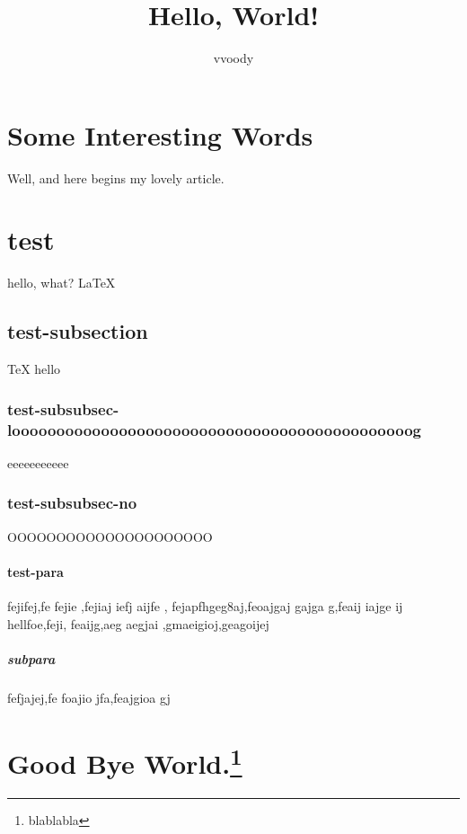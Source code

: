 \documentclass[a4paper,11pt, twoside]{article}
\author{vvoody}
\title{Hello, World!}
\begin{document}

\maketitle


\tableofcontents

\newpage
\section{Some Interesting Words}

Well, and here begins my lovely article.

\section{test}

hello, what? \LaTeX
\label{sec:sec1}

\subsection{test-subsection}

\TeX{} hello

\subsubsection[not-too-long]{test-subsubsec-looooooooooooooooooooooooooooooooooooooooooooog}

eeeeeeeeeee

\subsubsection*{test-subsubsec-no}

OOOOOOOOOOOOOOOOOOOOO

\paragraph{test-para}

fejifej,fe fejie ,fejiaj iefj aijfe ,
fejapfhgeg8aj,feoajgaj gajga g,feaij iajge ij hellfoe,feji,
feaijg,aeg aegjai ,gmaeigioj,geagoijej

\subparagraph{subpara}

fefjajej,fe foajio jfa,feajgioa gj

\newpage
\section{Good Bye World.\protect\footnote{blablabla}}
\end{document}
